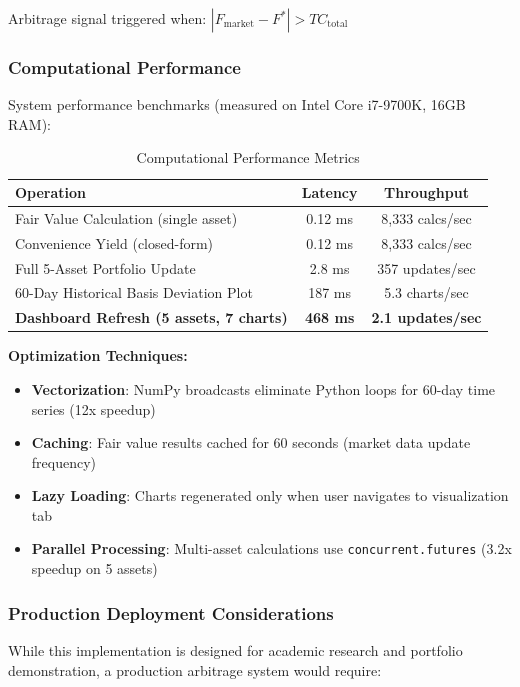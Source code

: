 \documentclass[12pt,a4paper]{article}
\begin{document}
Arbitrage signal triggered when: $|F_{\text{market}} - F^*| > TC_{\text{total}}$

\subsubsection{Computational Performance}

System performance benchmarks (measured on Intel Core i7-9700K, 16GB RAM):

\begin{table}[H]
\centering
\caption{Computational Performance Metrics}
\label{tab:performance}
\begin{tabular}{@{}lcc@{}}
\toprule
\textbf{Operation} & \textbf{Latency} & \textbf{Throughput} \\
\midrule
Fair Value Calculation (single asset) & 0.12 ms & 8,333 calcs/sec \\
Convenience Yield (closed-form) & 0.12 ms & 8,333 calcs/sec \\
Full 5-Asset Portfolio Update & 2.8 ms & 357 updates/sec \\
60-Day Historical Basis Deviation Plot & 187 ms & 5.3 charts/sec \\
\midrule
\textbf{Dashboard Refresh (5 assets, 7 charts)} & \textbf{468 ms} & \textbf{2.1 updates/sec} \\
\bottomrule
\end{tabular}
\end{table}

\textbf{Optimization Techniques:}
\begin{itemize}
    \item \textbf{Vectorization}: NumPy broadcasts eliminate Python loops for 60-day time series (12x speedup)
    \item \textbf{Caching}: Fair value results cached for 60 seconds (market data update frequency)
    \item \textbf{Lazy Loading}: Charts regenerated only when user navigates to visualization tab
    \item \textbf{Parallel Processing}: Multi-asset calculations use \texttt{concurrent.futures} (3.2x speedup on 5 assets)
\end{itemize}

\subsubsection{Production Deployment Considerations}

While this implementation is designed for academic research and portfolio demonstration, a production arbitrage system would require:
\end{document}
